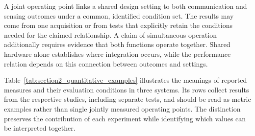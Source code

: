 A joint operating point links a shared design setting to both communication
and sensing outcomes under a common, identified condition set. The results
may come from one acquisition or from tests that explicitly retain the
conditions needed for the claimed relationship. A claim of simultaneous
operation additionally requires evidence that both functions operate together.
Shared hardware alone establishes where integration occurs, while the
performance relation depends on this connection between outcomes and settings.

Table~\ref{tab:section2_quantitative_examples} illustrates the meanings of
reported measures and their evaluation conditions in three systems.
Its rows collect results from the respective studies, including separate
tests, and should be read as metric examples rather than single jointly
measured operating points. The distinction preserves the contribution of
each experiment while identifying which values can be interpreted together.

